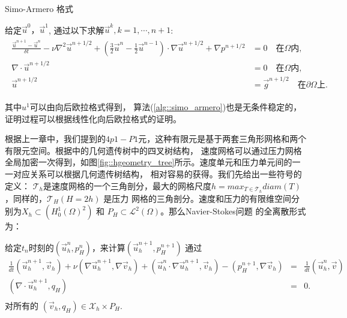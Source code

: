         \begin{algorithm}
            \caption{Simo-Armero 格式}
            \begin{algorithmic}[1]
                给定$\vec{u}^0， \vec{u}^1$, 通过以下求解$\vec{u}^{k}, k = 1, \cdots, n + 1$:
                \begin{eqnarray}
                    \begin{aligned}
                        \frac{\vec{u}^{n + 1} - \vec{u}^n}{\delta t} - \nu \nabla^2\vec{u}^{n + 1/2} + (\frac{3}{2}\vec{u}^n - \frac{1}{2}\vec{u}^{n - 1}) \cdot \nabla\vec{u}^{n + 1/2}
                        + \nabla p^{n + 1/2} & = 0\quad \mbox {在} \Omega \mbox{内},& \\
                        \nabla \cdot \vec{u}^{n + 1/2} & = 0 \quad \mbox{在} \Omega \mbox{内},& \\
                        \vec{u}^{n + 1/2} & = \vec{g}^{n + 1/2} \quad \mbox{在} \partial \Omega \mbox{上}.&
                        \label{eq::simo_arero}
                    \end{aligned}
               \end{eqnarray}
            \end{algorithmic}
            \label{alg::simo_armero}
         \end{algorithm}
        其中$u^1$可以由向后欧拉格式得到， 算法(\ref{alg::simo_armero})也是无条件稳定的，证明过程可以根据线性化向后欧拉格式的证明。

   根据上一章中，我们提到的$4p1-P1$元，这种有限元是基于两套三角形网格和两个有限元空间。根据\cite{li2005multi}中的几何遗传树中的四叉树结构，
   速度网格可以通过压力网格全局加密一次得到，如图\ref{fig::hgeometry_tree}所示。速度单元和压力单元间的一一对应关系可以根据几何遗传树结构，
   相对容易的获得。我们先给出一些符号的定义：
   $\mathcal{T}_h$是速度网格的一个三角剖分，最大的网格尺度$h = max_{T \in \mathcal{T}_h} diam(T)$，同样的，$\mathcal{T}_{H}(H = 2h)$ 是压力
   网格的三角剖分。速度和压力的有限维空间分别为$X_h \subset (H_0^1(\Omega)^2)$ 和 $P_H \subset \mathcal{L}^2(\Omega)$。那么Navier-Stokes问题
   的全离散形式为：

   给定$t_n$时刻的$(\vec{u}_h^n, p_H^n)$，来计算$(\vec{u}_h^{n + 1}, p_H^{n + 1})$ 通过
   \begin{equation}
     \begin{aligned}
       \frac{1}{dt}(\vec{u}_h^{n + 1}, \vec{v}_h) + \nu (\nabla
       \vec{u}_h^{n + 1}, \nabla \vec{v}_h) + (\vec{u}_h^n \cdot
       \nabla \vec{u}_h^{n + 1}, \vec{v}_h) - (p_H^{n + 1}, \nabla
       \vec{v}_h) & = &\frac{1}{dt}(\vec{u}_h^n, \vec{v}) \\
       (\nabla \cdot \vec{u}_h^{n + 1}, q_H) & = & 0. \\
     \end{aligned}
     \label{eq::NS_weak_form}
   \end{equation}
   对所有的 $(\vec{v}_h, q_H) \in \mathcal{X}_h \times P_H$.

